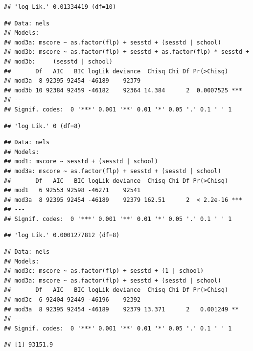 \documentclass[ignorenonframetext,]{beamer}
\begin{document}
\begin{frame}[fragile]{}

\begin{verbatim}
## 'log Lik.' 0.01334419 (df=10)
\end{verbatim}

\begin{verbatim}
## Data: nels
## Models:
## mod3a: mscore ~ as.factor(flp) + sesstd + (sesstd | school)
## mod3b: mscore ~ as.factor(flp) + sesstd + as.factor(flp) * sesstd + 
## mod3b:     (sesstd | school)
##       Df   AIC   BIC logLik deviance  Chisq Chi Df Pr(>Chisq)    
## mod3a  8 92395 92454 -46189    92379                             
## mod3b 10 92384 92459 -46182    92364 14.384      2  0.0007525 ***
## ---
## Signif. codes:  0 '***' 0.001 '**' 0.01 '*' 0.05 '.' 0.1 ' ' 1
\end{verbatim}

\begin{verbatim}
## 'log Lik.' 0 (df=8)
\end{verbatim}

\begin{verbatim}
## Data: nels
## Models:
## mod1: mscore ~ sesstd + (sesstd | school)
## mod3a: mscore ~ as.factor(flp) + sesstd + (sesstd | school)
##       Df   AIC   BIC logLik deviance  Chisq Chi Df Pr(>Chisq)    
## mod1   6 92553 92598 -46271    92541                             
## mod3a  8 92395 92454 -46189    92379 162.51      2  < 2.2e-16 ***
## ---
## Signif. codes:  0 '***' 0.001 '**' 0.01 '*' 0.05 '.' 0.1 ' ' 1
\end{verbatim}

\begin{verbatim}
## 'log Lik.' 0.0001277812 (df=8)
\end{verbatim}

\begin{verbatim}
## Data: nels
## Models:
## mod3c: mscore ~ as.factor(flp) + sesstd + (1 | school)
## mod3a: mscore ~ as.factor(flp) + sesstd + (sesstd | school)
##       Df   AIC   BIC logLik deviance  Chisq Chi Df Pr(>Chisq)   
## mod3c  6 92404 92449 -46196    92392                            
## mod3a  8 92395 92454 -46189    92379 13.371      2   0.001249 **
## ---
## Signif. codes:  0 '***' 0.001 '**' 0.01 '*' 0.05 '.' 0.1 ' ' 1
\end{verbatim}

\begin{verbatim}
## [1] 93151.9
\end{verbatim}

\end{frame}
\end{document}

